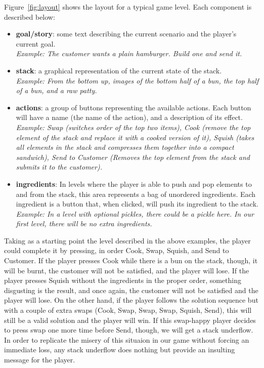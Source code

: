 \documentclass{sig-alternate}
\begin{document}
Figure~\ref{fig:layout} shows the layout for a typical game level. Each component is described below:
\begin{itemize}
\item \textbf{goal/story}: some text describing the current scenario and the player's current goal.
\\
\textit{Example: The customer wants a plain hamburger. Build one and send it.}
\item \textbf{stack}: a graphical representation of the current state of the stack.
\\
\textit{Example: From the bottom up, images of the bottom half of a bun, the top half of a bun, and a raw patty.}
\item \textbf{actions}: a group of buttons representing the available actions. Each button will have a name (the name of the action), and a description of its effect.
\\
\textit{Example: Swap (switches order of the top two items), Cook (remove the top element of the stack and replace it with a cooked version of it), Squish (takes all elements in the stack and compresses them together into a compact sandwich), Send to Customer (Removes the top element from the stack and submits it to the customer).}
\item \textbf{ingredients}: In levels where the player is able to push and pop elements to and from the stack, this area represents a bag of unordered ingredients. Each ingredient is a button that, when clicked, will push its ingredient to the stack.
\\
\textit{Example: In a level with optional pickles, there could be a pickle here. In our first level, there will be no extra ingredients.}
\end{itemize}

Taking as a starting point the level described in the above examples, the player could complete it by pressing, in order Cook, Swap, Squish, and Send to Customer. If the player presses Cook while there is a bun on the stack, though, it will be burnt, the customer will not be satisfied, and the player will lose. If the player presses Squish without the ingredients in the proper order, something disgusting is the result, and once again, the customer will not be satisfied and the player will lose. On the other hand, if the player follows the solution sequence but with a couple of extra swaps (Cook, Swap, Swap, Swap, Squish, Send), this will still be a valid solution and the player will win. If this swap-happy player decides to press swap one more time before Send, though, we will get a stack underflow. In order to replicate the misery of this situaion in our game without forcing an immediate loss, any stack underflow does nothing but provide an insulting message for the player.
\end{document}
